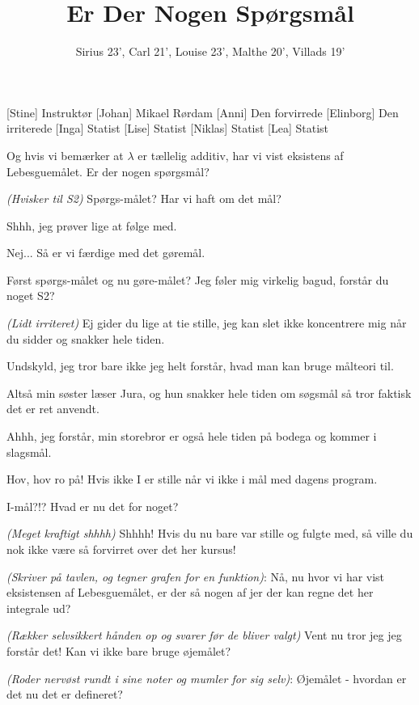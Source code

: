 \documentclass[a4paper,11pt]{article}
\title{Er Der Nogen Spørgsmål}
\author{Sirius 23', Carl 21', Louise 23’, Malthe 20', Villads 19'}
\begin{document}
\maketitle

\begin{roles}
[Stine] Instruktør
[Johan] Mikael Rørdam
[Anni] Den forvirrede
[Elinborg] Den irriterede
[Inga] Statist
[Lise] Statist
[Niklas] Statist
[Lea] Statist
\end{roles}

\begin{sketch}

 Og hvis vi bemærker at $\lambda$ er tællelig additiv, har vi vist eksistens af Lebesguemålet. Er der nogen spørgsmål?

 \emph{(Hvisker til S2)} Spørgs-målet? Har vi haft om det mål?

 Shhh, jeg prøver lige at følge med.

 Nej... Så er vi færdige med det gøremål.

 Først spørgs-målet og nu gøre-målet? Jeg føler mig virkelig bagud, forstår du noget S2?

\emph{(Lidt irriteret)} Ej gider du lige at tie stille, jeg kan slet ikke koncentrere
mig når du sidder og snakker hele tiden.

 Undskyld, jeg tror bare ikke jeg helt forstår, hvad man kan bruge målteori til.

 Altså min søster læser Jura, og hun snakker hele tiden om søgsmål så tror faktisk det er ret anvendt.

 Ahhh, jeg forstår, min storebror er også hele tiden på bodega og kommer i slagsmål.


 Hov, hov ro på! Hvis ikke I er stille når vi ikke i mål med dagens program.


 I-mål?!? Hvad er nu det for noget?

\emph{(Meget kraftigt shhhh)} Shhhh! Hvis du nu bare var stille og fulgte med, så ville du nok ikke være så forvirret over det her kursus!

 \emph{(Skriver på tavlen, og tegner grafen for en funktion)}: Nå, nu hvor vi har vist eksistensen af Lebesguemålet, er der så nogen af jer der kan regne det her integrale ud?

\emph{(Rækker selvsikkert hånden op og svarer før de bliver valgt)} Vent nu tror jeg jeg forstår det! Kan vi ikke bare bruge øjemålet?

 \emph{(Roder nervøst rundt i sine noter og mumler for sig selv)}: Øjemålet - hvordan er det nu det er defineret?

\end{sketch}
\end{document}
